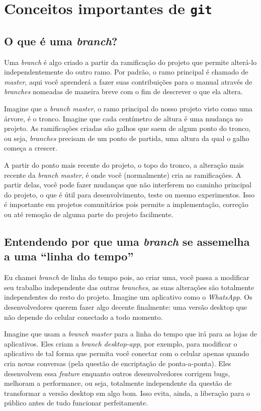 \documentclass[a4paper,oneside,10pt]{memoir}
\begin{document}
\section{Conceitos importantes de \texttt{git}}

\subsection{O que é uma \emph{branch}?}

Uma \emph{branch} é algo criado a partir da ramificação do projeto que permite
alterá-lo independentemente do outro ramo. Por padrão, o ramo principal é
chamado de \emph{master}, aqui você aprenderá a fazer suas contribuições para o
manual através de \emph{branches} nomeadas de maneira breve com o fim de
descrever o que ela altera.

Imagine que a \emph{branch master}, o ramo principal do nosso projeto visto
como uma árvore, é o tronco. Imagine que cada centímetro de altura é uma
mudança no projeto. As ramificações criadas são galhos que saem de algum ponto
do tronco, ou seja, \emph{branches} precisam de um ponto de partida, uma altura
da qual o galho começa a crescer.

A partir do ponto mais recente do projeto, o topo do tronco, a alteração mais
recente da \emph{branch master}, é onde você (normalmente) cria as
ramificações. A partir delas, você pode fazer mudanças que não interferem no
caminho principal do projeto, o que é útil para desenvolvimento, teste ou mesmo
experimentos. Isso é importante em projetos comunitários pois permite a
implementação, correção ou até remoção de alguma parte do projeto facilmente.

\subsection{Entendendo por que uma \emph{branch} se assemelha a uma ``linha do
tempo''}

Eu chamei \emph{branch} de linha do tempo pois, ao criar uma, você passa a
modificar seu trabalho independente das outras \emph{branches}, as suas
alterações são totalmente independentes do resto do projeto. Imagine um
aplicativo como o \emph{WhatsApp}. Os desenvolvedores querem fazer algo decente
finalmente: uma versão desktop que não depende do celular conectado a todo
momento.

Imagine que usam a \emph{branch master} para a linha do tempo que irá para as
lojas de aplicativos. Eles criam a \emph{branch desktop-app}, por exemplo, para
modificar o aplicativo de tal forma que permita você conectar com o celular
apenas quando cria novas conversas (pela questão de encriptação de
ponta-a-ponta). Eles desenvolvem essa \emph{feature} enquanto outros
desenvolvedores corrigem bugs, melhoram a performance, ou seja, totalmente
independente da questão de transformar a versão desktop em algo bom. Isso
evita, ainda, a liberação para o público antes de tudo funcionar perfeitamente.
\end{document}
